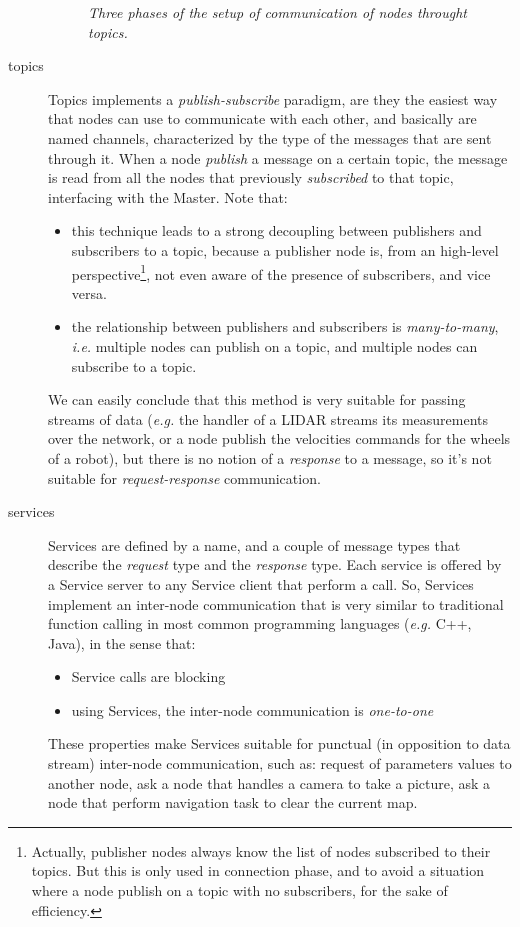 \begin{description}
\begin{figure}
	\caption{\textit{Three phases of the setup of communication of nodes throught topics.}}
	\label{fig:topicRegistration}
\end{figure}


\item[topics] Topics implements a \textit{publish-subscribe} paradigm, are they the easiest way that nodes can use to communicate with each other, and basically are named channels, characterized by the type of the messages that are sent through it. When a node \textit{publish} a message on a certain topic, the message is read from all the nodes that previously \textit{subscribed} to that topic, interfacing with the Master. Note that:
\begin{itemize}
	\item this technique leads to a strong decoupling between publishers and subscribers to a topic, because a publisher node is, from an high-level perspective\footnote{Actually, publisher nodes always know the list of nodes subscribed to their topics. But this  is only used in connection phase, and to avoid a situation where a node publish on a topic with no subscribers, for the sake of efficiency.},
	not even aware of the presence of subscribers, and vice versa.
	\item the relationship between publishers and subscribers is \textit{many-to-many}, \textit{i.e.} multiple nodes can publish on a topic, and multiple nodes can subscribe to a topic.
\end{itemize}
We can easily conclude that this method is very suitable for passing streams of data (\textit{e.g.} the handler of a \ac{LIDAR} streams its measurements over the network, or a node publish the velocities commands for the wheels of a robot), but there is no notion of a \textit{response} to a message, so it's not suitable for \textit{request-response} communication. 


\item[services] Services are defined by a name, and a couple of message types that describe the \textit{request} type and the \textit{response} type. Each service is offered by a Service server to any Service client that perform a call. So, Services implement an inter-node communication that is very similar to traditional function calling in most common programming languages (\textit{e.g.} C++, Java), in the sense that:
\begin{itemize}
	\item Service calls are blocking
	\item using Services, the inter-node communication is \textit{one-to-one}
\end{itemize}
These properties make Services suitable for punctual (in opposition to data stream) inter-node communication, such as: request of parameters values to another node, ask a node that handles a camera to take a picture, ask a node that perform navigation task to clear the current map.


\end{description}
